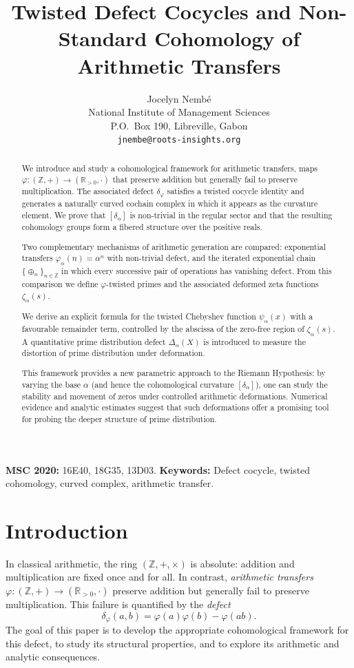\documentclass[11pt,a4paper]{article}
\title{Twisted Defect Cocycles and Non-Standard Cohomology of Arithmetic Transfers}
\author{Jocelyn Nemb\'e \\
	\small National Institute of Management Sciences \\
	\small P.O.\ Box 190, Libreville, Gabon \\
	\small \texttt{jnembe@roots-insights.org}}
\date{}
\theoremstyle{plain}
\theoremstyle{definition}
\theoremstyle{remark}
\newcommand{\ZZ}{\mathbb{Z}}
\newcommand{\RR}{\mathbb{R}}
\begin{document}
	\maketitle
	
	\begin{abstract}
		We introduce and study a cohomological framework for arithmetic transfers, maps $\varphi:(\ZZ,+)\to(\RR_{>0},\cdot)$ that preserve addition but generally fail to preserve multiplication. The associated defect $\delta_\varphi$ satisfies a twisted cocycle identity and generates a naturally curved cochain complex in which it appears as the curvature element. We prove that $[\delta_\alpha]$ is non-trivial in the regular sector and that the resulting cohomology groups form a fibered structure over the positive reals.
		
		Two complementary mechanisms of arithmetic generation are compared: exponential transfers $\varphi_\alpha(n)=\alpha^n$ with non-trivial defect, and the iterated exponential chain $\{\oplus_n\}_{n\in\ZZ}$ in which every successive pair of operations has vanishing defect. From this comparison we define $\varphi$-twisted primes and the associated deformed zeta functions $\zeta_\alpha(s)$.
		
		We derive an explicit formula for the twisted Chebyshev function $\psi_\alpha(x)$ with a favourable remainder term, controlled by the abscissa of the zero-free region of $\zeta_\alpha(s)$. A quantitative prime distribution defect $\Delta_\alpha(X)$ is introduced to measure the distortion of prime distribution under deformation.
		
		This framework provides a new parametric approach to the Riemann Hypothesis: by varying the base $\alpha$ (and hence the cohomological curvature $[\delta_\alpha]$), one can study the stability and movement of zeros under controlled arithmetic deformations. Numerical evidence and analytic estimates suggest that such deformations offer a promising tool for probing the deeper structure of prime distribution.
	\end{abstract}
	
	\noindent\textbf{MSC 2020:} 16E40, 18G35, 13D03.
	\noindent\textbf{Keywords:} Defect cocycle, twisted cohomology, curved complex, arithmetic transfer.
	
	\section{Introduction}
	\label{sec:intro}
	In classical arithmetic, the ring $(\mathbb{Z}, +, \times)$ is absolute: addition and multiplication are fixed once and for all. In contrast, \emph{arithmetic transfers} $\varphi:(\ZZ,+)\to(\RR_{>0},\cdot)$ preserve addition but generally fail to preserve multiplication. This failure is quantified by the \emph{defect}
	\[
	\delta_\varphi(a,b)=\varphi(a)\varphi(b)-\varphi(ab).
	\]
	The goal of this paper is to develop the appropriate cohomological framework for this defect, to study its structural properties, and to explore its arithmetic and analytic consequences.
	
\end{document}
